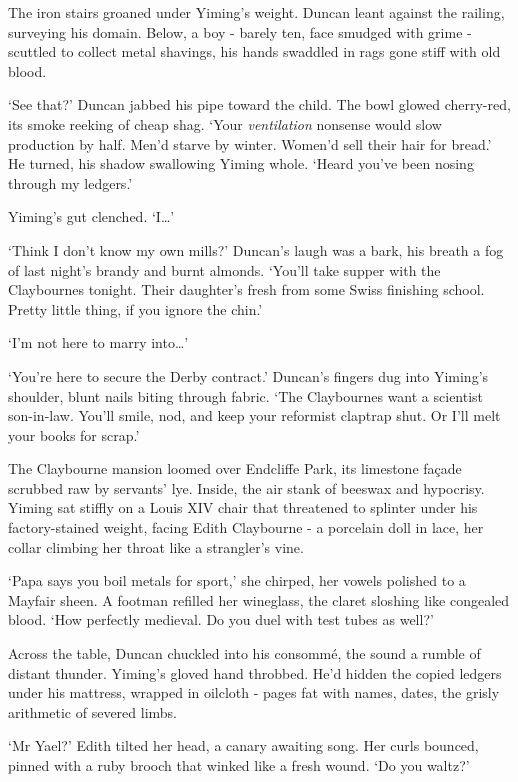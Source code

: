 The iron stairs groaned under Yiming's weight. Duncan leant against the railing, surveying his domain. Below, a boy - barely ten, face smudged with grime - scuttled to collect metal shavings, his hands swaddled in rags gone stiff with old blood.

`See that?' Duncan jabbed his pipe toward the child. The bowl glowed cherry-red, its smoke reeking of cheap shag. `Your \textit{ventilation} nonsense would slow production by half. Men'd starve by winter. Women'd sell their hair for bread.' He turned, his shadow swallowing Yiming whole. `Heard you've been nosing through my ledgers.'

Yiming's gut clenched. `I\dots'

`Think I don't know my own mills?' Duncan's laugh was a bark, his breath a fog of last night's brandy and burnt almonds. `You'll take supper with the Claybournes tonight. Their daughter's fresh from some Swiss finishing school. Pretty little thing, if you ignore the chin.'

`I'm not here to marry into\dots'

`You're here to secure the Derby contract.' Duncan's fingers dug into Yiming's shoulder, blunt nails biting through fabric. `The Claybournes want a scientist son-in-law. You'll smile, nod, and keep your reformist claptrap shut. Or I'll melt your books for scrap.'

The Claybourne mansion loomed over Endcliffe Park, its limestone façade scrubbed raw by servants' lye. Inside, the air stank of beeswax and hypocrisy. Yiming sat stiffly on a Louis XIV chair that threatened to splinter under his factory-stained weight, facing Edith Claybourne - a porcelain doll in lace, her collar climbing her throat like a strangler's vine.

`Papa says you boil metals for sport,' she chirped, her vowels polished to a Mayfair sheen. A footman refilled her wineglass, the claret sloshing like congealed blood. `How perfectly medieval. Do you duel with test tubes as well?'

Across the table, Duncan chuckled into his consommé, the sound a rumble of distant thunder. Yiming's gloved hand throbbed. He'd hidden the copied ledgers under his mattress, wrapped in oilcloth - pages fat with names, dates, the grisly arithmetic of severed limbs.

`Mr Yael?' Edith tilted her head, a canary awaiting song. Her curls bounced, pinned with a ruby brooch that winked like a fresh wound. `Do you waltz?'

